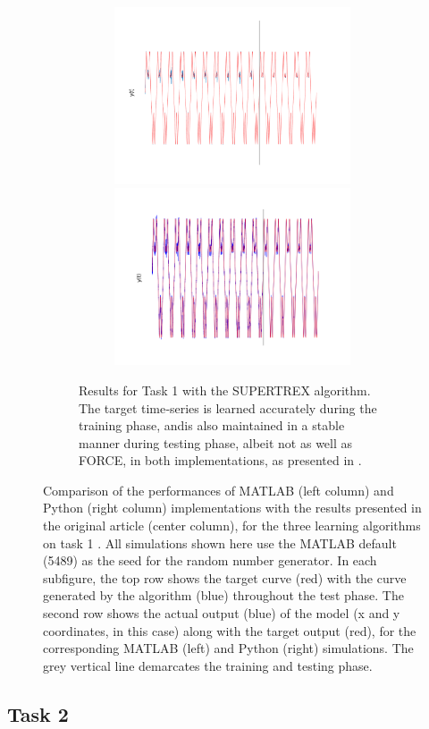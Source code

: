 \begin{figure}
\begin{subfigure}{\textwidth}
\begin{subfigure}{\textwidth}
        \end{subfigure}
         
        
        
        \textbf{}\begin{subfigure}{\textwidth}
        \centering
        
        \includegraphics[trim=2cm 0cm 0cm 0cm, clip=true,height=0.1\linewidth,width=.45\linewidth]{Figures/MATLAB/ST_T1_CoordinateY.png}
        \includegraphics[trim=2cm 0cm 0cm 0cm, clip=true,height=0.1\linewidth,width=.45\linewidth]{Figures/Python/ST_T1_CoordinateY.png}
        
        \end{subfigure}
        

    \caption{Results for Task 1 with the SUPERTREX algorithm. The target time‐series is learned accurately during the training phase, andis also maintained in a stable manner during testing phase, albeit not as well as FORCE, in both implementations, as presented in \cite{pyle2019}.}
    \label{Fig:compTask1ST}
    
    \end{subfigure}


\caption{Comparison of the performances of MATLAB (left column) and Python (right column) implementations with the results presented in the original article (center column), for the three learning algorithms on task 1 \cite{pyle2019}. All simulations shown here use the MATLAB default (5489) as the seed for the random number generator. In each subfigure, the top row shows the target curve (red) with the curve generated by the algorithm (blue) throughout the test phase. The second row shows the actual output (blue) of the model (x and y coordinates, in this case) along with the target output (red), for the corresponding MATLAB (left) and Python (right) simulations. The grey vertical line demarcates the training and testing phase.}
\label{Fig:Comparison_Task1}

\end{figure}



\subsection{Task 2}

